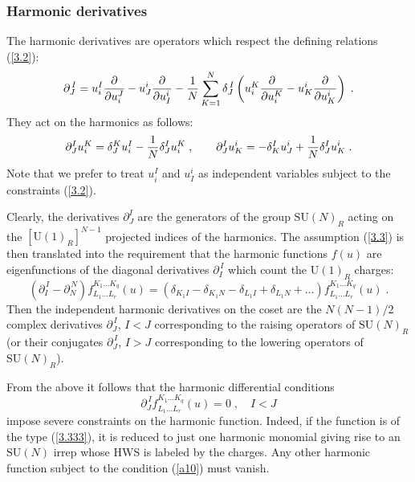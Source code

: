 \documentclass[a4paper,12pt]{article}
\begin{document}
\subsubsection{Harmonic derivatives}

The harmonic derivatives are operators which  respect the defining 
relations (\ref{3.2}): 
\begin{equation}\label{3.4}
  \partial^{\,I}_J = u^I_i{\partial\over\partial u^J_i} - 
u^i_J{\partial\over\partial u^i_I} - {1\over 
N}\sum^N_{K=1}\delta^{\,I}_J \left(u^K_i{\partial\over\partial 
u^K_i} - u^i_K{\partial\over\partial u^i_K} \right)\;. 
\end{equation} 
They act on the harmonics as follows: 
\begin{equation}
\partial^I_J u^K_i=\delta^K_J u^I_i - {1\over N}\delta^{I}_J u^K_i \;,\qquad
\partial^I_J u^i_K=-\delta^I_K u^i_J +  {1\over N}\delta^{I}_J u^i_K\; .\label{3.5}
\end{equation}
Note that we prefer to treat $u^I_i$ and $u^i_I$ as independent 
variables subject to the constraints (\ref{3.2}).

Clearly, the derivatives $\partial^I_J$ are the generators of the 
group $\mbox{SU}(N)_R$ acting on the $[\mbox{U}(1)_R]^{N-1}$ 
projected indices of the harmonics. The assumption (\ref{3.3}) is 
then translated into the requirement that the harmonic functions 
$f(u)$ are eigenfunctions of the diagonal derivatives 
$\partial^{\,I}_I$ which count the $\mbox{U}(1)_R$ charges: 
\begin{equation}\label{3.6}
(\partial^{\,I}_I-\partial^{\,N}_N) f^{K_1\ldots K_q}_{L_1\ldots 
L_r}(u) = (\delta_{K_1I} -\delta_{K_1N} - \delta_{L_1I} 
+\delta_{L_1N} +\ldots) f^{K_1\ldots K_q}_{L_1\ldots L_r}(u)\;. 
\end{equation}
Then the independent harmonic derivatives on the coset are the 
$N(N-1)/2$ complex derivatives $\partial^{\,I}_J $, $I<J$ 
corresponding to the raising operators of $\mbox{SU}(N)_R$ (or 
their conjugates $\partial^{\,I}_J $, $I>J$ corresponding to the 
lowering operators of $\mbox{SU}(N)_R$). 

{}From the above it follows that the harmonic differential 
conditions 
\begin{equation}\label{a10}
  \partial^{\,I}_J f^{K_1\ldots K_q}_{L_1\ldots L_r}(u) = 0\;, \quad I<J
\end{equation}
impose severe constraints on the harmonic function. Indeed, if the 
function is of the type (\ref{3.333}), it is reduced to just one 
harmonic monomial giving rise to an $\mbox{SU}(N)$ irrep whose HWS 
is labeled by the charges. Any other harmonic function subject to 
the condition (\ref{a10}) must vanish. 
\end{document}
